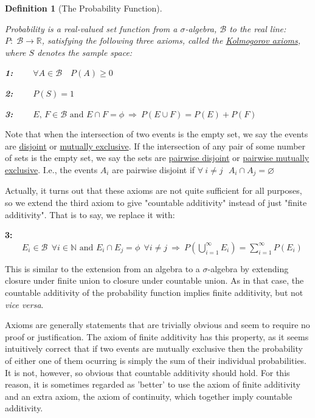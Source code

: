 \documentclass[12pt,a4paper]{article}
\newtheorem{defn}[thm]{Definition}
\begin{document}
\begin{defn}[The Probability Function]$\;$\par
\vspace{12pt}

Probability is a real-valued set function from a $\sigma$-algebra, $\mathcal{B}$ to the real line: $P:\;\mathcal{B}\rightarrow\mathbb{R}$, satisfying the following three axioms, called the \underline{Kolmogorov axioms}, where $S$ denotes the sample space:\par
\vspace{1pt}
{\bf 1:} $\qquad\forall A\in\mathcal{B}\quad P(A)\geq 0$\par
\vspace{10pt}
{\bf 2:} $\qquad P(S)=1$\par
\vspace{10pt}
{\bf 3:} $\qquad E,\, F\in\mathcal{B}\text{ and }E\cap F=\phi\:\Rightarrow\: P(E\cup F)=P(E)+P(F)$
\end{defn}

Note that when the intersection of two events is the empty set, we say the events are \underline{disjoint} or \underline{mutually exclusive}. If the intersection of any pair of some number of sets is the empty set, we say the sets are \underline{pairwise disjoint} or \underline{pairwise mutually exclusive}. I.e., the events $A_i$ are pairwise disjoint if $\forall \:i\neq j \:\:\:A_i\cap A_j = \varnothing$

Actually, it turns out that these axioms are not quite sufficient for all purposes, so we extend the third axiom to give "countable additivity" instead of just "finite additivity". That is to say, we replace it with:\par
\vspace{10pt}
{\bf 3:} $\qquad E_i\in\mathcal{B}\:\:\forall i\in\mathbb{N}\text{ and }E_i\cap E_j=\phi\:\:\forall i\neq j\:\Rightarrow\:P(\bigcup_{i=1}^{\infty}E_i)=\sum_{i=1}^{\infty}P(E_i)$\par
\vspace{10pt}

This is similar to the extension from an algebra to a $\sigma$-algebra by extending closure under finite union to closure under countable union. As in that case, the countable additivity of the probability function implies finite additivity, but not {\it vice versa}.

Axioms are generally statements that are trivially obvious and seem to require no proof or justification. The axiom of finite additivity has this property, as it seems intuitively correct that if two events are mutually exclusive then the probability of either one of them ocurring is simply the sum of their individual probabilities. It is not, however, so obvious that countable additivity should hold. For this reason, it is sometimes regarded as 'better' to use the axiom of finite additivity and an extra axiom, the axiom of continuity, which together imply countable additivity.\par
\vspace{12pt}
\end{document}
